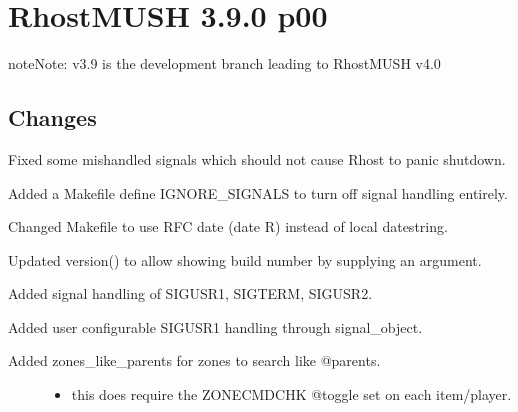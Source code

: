 \documentclass[letterpaper,10pt,english]{sphinxmanual}
\begin{document}
\section{RhostMUSH 3.9.0 p00}
\label{\detokenize{changelog:rhostmush-3-9-0-p00}}\label{\detokenize{changelog:changelog-3-9-0p00}}
\begin{sphinxadmonition}{note}{Note:}
\sphinxAtStartPar
v3.9 is the development branch leading to RhostMUSH v4.0
\end{sphinxadmonition}


\subsection{Changes}
\label{\detokenize{changelog:changes}}
\sphinxAtStartPar
Fixed some mishandled signals which should not cause Rhost to panic shutdown.

\sphinxAtStartPar
Added a Makefile define IGNORE\_SIGNALS to turn off signal handling entirely.

\sphinxAtStartPar
Changed Makefile to use RFC date (date \sphinxhyphen{}R) instead of local datestring.

\sphinxAtStartPar
Updated version() to allow showing build number by supplying an argument.

\sphinxAtStartPar
Added signal handling of SIGUSR1, SIGTERM, SIGUSR2.

\sphinxAtStartPar
Added user configurable SIGUSR1 handling through signal\_object.
\begin{description}
\item[{Added zones\_like\_parents for zones to search like @parents.}] \leavevmode\begin{itemize}
\item {} 
\sphinxAtStartPar
this does require the ZONECMDCHK @toggle set on each item/player.

\end{itemize}

\end{description}
\end{document}
